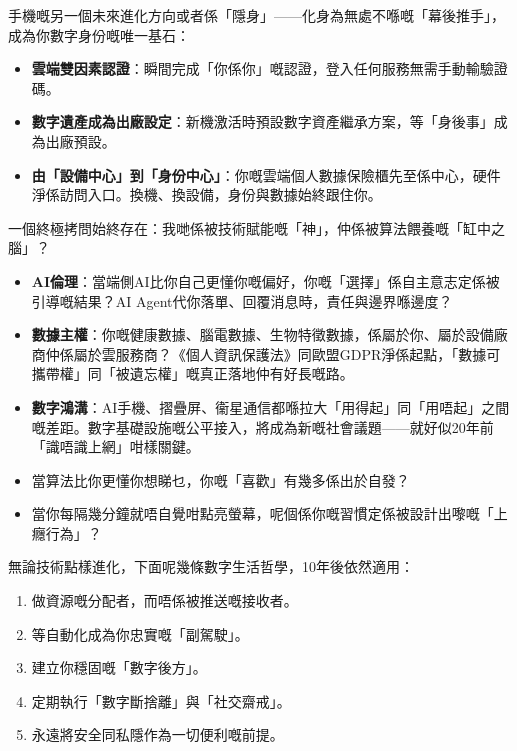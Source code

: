 手機嘅另一個未來進化方向或者係「隱身」——化身為無處不喺嘅「幕後推手」，成為你數字身份嘅唯一基石：

\begin{itemize}
  \item \textbf{雲端雙因素認證}：瞬間完成「你係你」嘅認證，登入任何服務無需手動輸驗證碼。
  \item \textbf{數字遺產成為出廠設定}：新機激活時預設數字資產繼承方案，等「身後事」成為出廠預設。
  \item \textbf{由「設備中心」到「身份中心」}：你嘅雲端個人數據保險櫃先至係中心，硬件淨係訪問入口。換機、換設備，身份與數據始終跟住你。
\end{itemize}


一個終極拷問始終存在：我哋係被技術賦能嘅「神」，仲係被算法餵養嘅「缸中之腦」？

\begin{itemize}
  \item \textbf{AI倫理}：當端側AI比你自己更懂你嘅偏好，你嘅「選擇」係自主意志定係被引導嘅結果？AI Agent代你落單、回覆消息時，責任與邊界喺邊度？
  \item \textbf{數據主權}：你嘅健康數據、腦電數據、生物特徵數據，係屬於你、屬於設備廠商仲係屬於雲服務商？《個人資訊保護法》同歐盟GDPR淨係起點，「數據可攜帶權」同「被遺忘權」嘅真正落地仲有好長嘅路。
  \item \textbf{數字鴻溝}：AI手機、摺疊屏、衞星通信都喺拉大「用得起」同「用唔起」之間嘅差距。數字基礎設施嘅公平接入，將成為新嘅社會議題——就好似20年前「識唔識上網」咁樣關鍵。
  \item 當算法比你更懂你想睇乜，你嘅「喜歡」有幾多係出於自發？
  \item 當你每隔幾分鐘就唔自覺咁點亮螢幕，呢個係你嘅習慣定係被設計出嚟嘅「上癮行為」？
\end{itemize}


無論技術點樣進化，下面呢幾條數字生活哲學，10年後依然適用：

\begin{enumerate}
  \item 做資源嘅分配者，而唔係被推送嘅接收者。
  \item 等自動化成為你忠實嘅「副駕駛」。
  \item 建立你穩固嘅「數字後方」。
  \item 定期執行「數字斷捨離」與「社交齋戒」。
  \item 永遠將安全同私隱作為一切便利嘅前提。
\end{enumerate}

